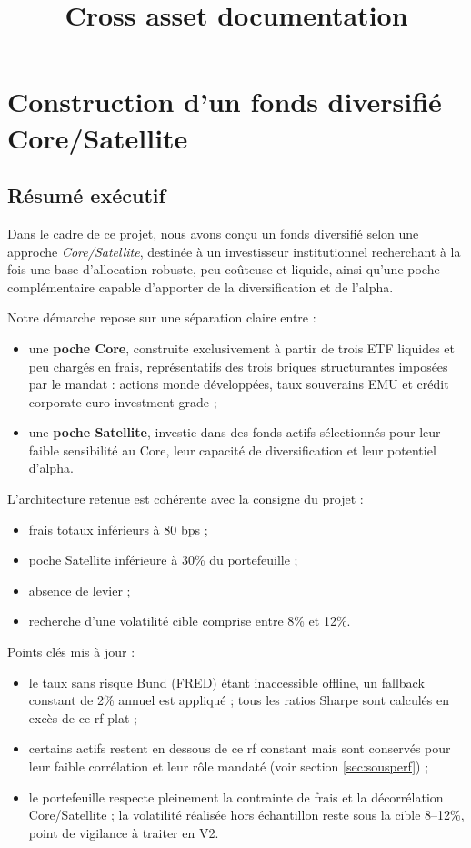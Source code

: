 \documentclass{article}
\title{Cross asset documentation}
\begin{document}
\maketitle

\section{Construction d’un fonds diversifié Core/Satellite}

\subsection{Résumé exécutif}

Dans le cadre de ce projet, nous avons conçu un fonds diversifié selon une approche \textit{Core/Satellite}, destinée à un investisseur institutionnel recherchant à la fois une base d’allocation robuste, peu coûteuse et liquide, ainsi qu’une poche complémentaire capable d’apporter de la diversification et de l’alpha.

Notre démarche repose sur une séparation claire entre :
\begin{itemize}
    \item une \textbf{poche Core}, construite exclusivement à partir de trois ETF liquides et peu chargés en frais, représentatifs des trois briques structurantes imposées par le mandat : actions monde développées, taux souverains EMU et crédit corporate euro investment grade ;
    \item une \textbf{poche Satellite}, investie dans des fonds actifs sélectionnés pour leur faible sensibilité au Core, leur capacité de diversification et leur potentiel d’alpha.
\end{itemize}

L’architecture retenue est cohérente avec la consigne du projet :
\begin{itemize}
    \item frais totaux inférieurs à 80 bps ;
    \item poche Satellite inférieure à 30\% du portefeuille ;
    \item absence de levier ;
    \item recherche d’une volatilité cible comprise entre 8\% et 12\%.
\end{itemize}

Points clés mis à jour :
\begin{itemize}
    \item le taux sans risque Bund (FRED) étant inaccessible offline, un fallback constant de 2\% annuel est appliqué ; tous les ratios Sharpe sont calculés en excès de ce rf plat ;
    \item certains actifs restent en dessous de ce rf constant mais sont conservés pour leur faible corrélation et leur rôle mandaté (voir section \ref{sec:sousperf}) ;
    \item le portefeuille respecte pleinement la contrainte de frais et la décorrélation Core/Satellite ; la volatilité réalisée hors échantillon reste sous la cible 8--12\%, point de vigilance à traiter en V2.
\end{itemize}
\end{document}
